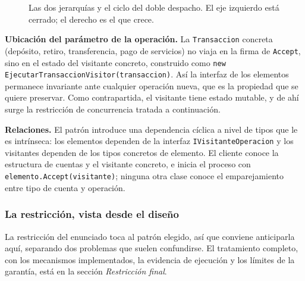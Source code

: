 \begin{figure}[h!]
    \caption{Las dos jerarquías y el ciclo del doble despacho. El eje izquierdo está
    cerrado; el derecho es el que crece.}
\end{figure}

\textbf{Ubicación del parámetro de la operación.} La \texttt{Transaccion} concreta (depósito,
retiro, transferencia, pago de servicios) no viaja en la firma de \texttt{Accept}, sino en el
estado del visitante concreto, construido como
\texttt{new EjecutarTransaccionVisitor(transaccion)}. Así la interfaz de los elementos
permanece invariante ante cualquier operación nueva, que es la propiedad que se quiere
preservar. Como contrapartida, el visitante tiene estado mutable, y de ahí surge la restricción
de concurrencia tratada a continuación.

\textbf{Relaciones.} El patrón introduce una dependencia cíclica a nivel de tipos que le es
intrínseca: los elementos dependen de la interfaz \texttt{IVisitanteOperacion} y los visitantes
dependen de los tipos concretos de elemento. El cliente conoce la estructura de cuentas y el
visitante concreto, e inicia el proceso con \texttt{elemento.Accept(visitante)}; ninguna otra
clase conoce el emparejamiento entre tipo de cuenta y operación.

\subsubsection*{La restricción, vista desde el diseño}

La restricción del enunciado toca al patrón elegido, así que conviene anticiparla aquí,
separando dos problemas que suelen confundirse. El tratamiento completo, con los mecanismos
implementados, la evidencia de ejecución y los límites de la garantía, está en la sección
\textit{Restricción final}.

